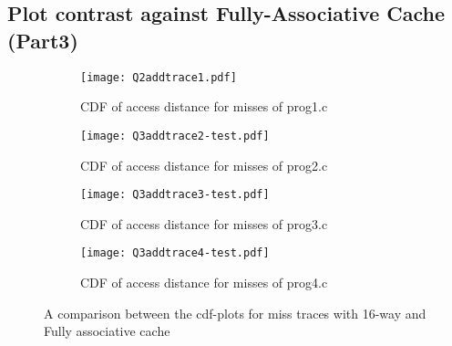 \subsection{Plot contrast against Fully-Associative Cache (Part3)}
\begin{figure}[H]
\centering
\begin{subfigure}{.48\textwidth}
  \centering
  \texttt{[image: Q2addtrace1.pdf]}
  \caption{CDF of access distance for misses of prog1.c}
  \label{fig:suba1}
\end{subfigure}%
\hspace{2mm}
\begin{subfigure}{.465\textwidth}
  \centering
  \texttt{[image: Q3addtrace2-test.pdf]}
  \caption{CDF of access distance for misses of prog2.c}
  \label{fig:suba2}
\end{subfigure}
\label{fig:testa1}
\vspace{0.8in}
\begin{subfigure}{.48\textwidth}
  \centering
  \texttt{[image: Q3addtrace3-test.pdf]}
  \caption{CDF of access distance for misses of prog3.c}
  \label{fig:suba3}
\end{subfigure}%
\hspace{2mm}
\begin{subfigure}{.465\textwidth}
  \centering
  \texttt{[image: Q3addtrace4-test.pdf]}
  \caption{CDF of access distance for misses of prog4.c}
  \label{fig:suba4}
\end{subfigure}
\caption{A comparison between the cdf-plots for miss traces with 16-way and Fully associative cache}
\label{fig:testa2}
\end{figure}